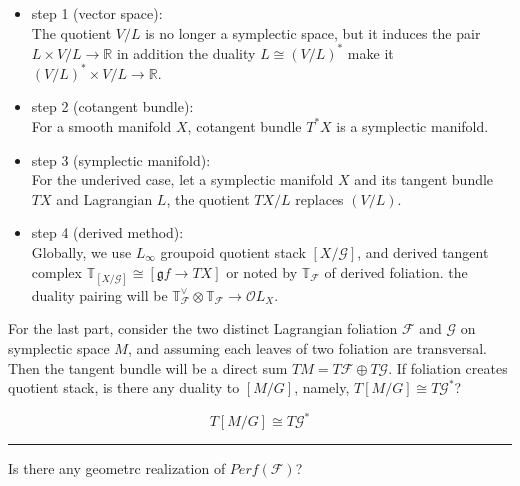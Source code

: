 \documentclass{article}
\begin{document}
\begin{definition} {}{}
\begin{itemize}
\item step 1 (vector space): \\
The quotient $V/L$ is no longer a symplectic space, but it induces the pair $L\times V/L \to \mathbb{R}$
in addition the duality $L\cong (V/L)^*$ make it $(V/L)^* \times V/L \to \mathbb{R}$. 

\item step 2 (cotangent bundle): \\
For a smooth manifold $X$, cotangent bundle $T^*X$ is a symplectic manifold.

\item step 3 (symplectic manifold): \\
For the underived case, let a symplectic manifold $X$ and its tangent bundle $TX$ and Lagrangian $L$, 
the quotient $TX/L$ replaces $(V/L)$. 

\item step 4 (derived method): \\
Globally, we use $L_\infty$ groupoid quotient stack $[X/\mathcal{G}]$, and 
derived tangent complex $\mathbb{T}_{[X/\mathcal{G}]} \cong [\mathfrak{g}f \to TX]$ 
or noted by $\mathbb{T}_{\mathcal{F}}$ of derived foliation.
the duality pairing will be $\mathbb{T}_{\mathcal{F}}^\vee \otimes \mathbb{T}_{\mathcal{F}} \to \mathcal{O}L_X$.
\end{itemize}
\end{definition}

\noindent
For the last part, consider the two distinct Lagrangian foliation $\mathcal{F}$ and $\mathcal{G}$ on symplectic space $M$, 
and assuming each leaves of two foliation are transversal. Then the tangent bundle will be a direct sum
$TM = T\mathcal{F} \oplus T\mathcal{G}$. If foliation creates quotient stack, is there any duality to $[M/G]$,
namely, $T[M/G] \cong T\mathcal{G}^*$?


\begin{conjecture}{}{}
\[ T[M/G] \cong T\mathcal{G}^* \]
\end{conjecture}


\vspace{0.5cm}
\noindent\rule{\textwidth}{0.4pt}
\vspace{0.5cm}

\begin{question}{}{}
Is there any geometrc realization of $Perf(\mathcal{F})$?
\end{question}
\end{document}
